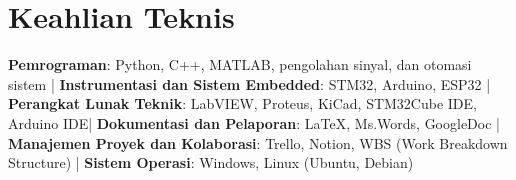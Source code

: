 \documentclass[10pt,a4paper]{article}
\begin{document}
\section*{Keahlian Teknis}

\textbf{Pemrograman}: Python, C++, MATLAB, pengolahan sinyal, dan otomasi sistem \quad | \quad
\textbf{Instrumentasi dan Sistem \linebreak Embedded}: STM32, Arduino, ESP32 \quad | \quad
\textbf{Perangkat Lunak Teknik}: LabVIEW, Proteus, KiCad, STM32Cube IDE, Arduino IDE\quad | \quad
\textbf{Dokumentasi dan Pelaporan}: LaTeX, Ms.Words, GoogleDoc \quad | \quad
\textbf{Manajemen Proyek dan Kolaborasi}: Trello, Notion, WBS (Work Breakdown Structure) \quad | \quad
\textbf{Sistem Operasi}: Windows, Linux (Ubuntu, Debian)
\end{document}

